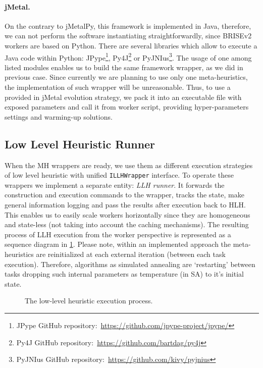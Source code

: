 \paragraph{jMetal.} On the contrary to jMetalPy, this framework is implemented in Java, therefore, we can not perform the software instantiating straightforwardly, since BRISEv2 workers are based on Python. There are several libraries which allow to execute a Java code within Python: JPype\footnote{JPype GitHub repository:~\url{https://github.com/jpype-project/jpype/}}, Py4J\footnote{Py4J GitHub repository:~\url{https://github.com/bartdag/py4j}} or PyJNIus\footnote{PyJNIus GitHub repository:~\url{https://github.com/kivy/pyjnius}}. The usage of one among listed modules enables us to build the same framework wrapper, as we did in previous case. Since currently we are planning to use only one meta-heuristics, the implementation of such wrapper will be unreasonable. Thus, to use a provided in jMetal evolution strategy, we pack it into an executable file with exposed parameters and call it from worker script, providing hyper-parameters settings and warming-up solutions.

\subsection{Low Level Heuristic Runner}
When the MH wrappers are ready, we use them as different execution strategies of low level heuristic with unified \texttt{ILLHWrapper} interface. To operate these wrappers we implement a separate entity: \emph{LLH runner}. It forwards the construction and execution commands to the wrapper, tracks the state, make general information logging and pass the results after execution back to HLH. This enables us to easily scale workers horizontally since they are homogeneous and state-less (not taking into account the caching mechanisms). The resulting process of LLH execution from the worker perspective is represented as a sequence diagram in \cref{impl:pict:llh sequence diagram}. Please note, within an implemented approach the meta-heuristics are reinitialized at each external iteration (between each task execution). Therefore, algorithms as simulated annealing are `restarting' between tasks dropping such internal parameters as temperature (in SA) to it's initial state.

\begin{figure}
	\centering
	
	\caption{The low-level heuristic execution process.}
	\label{impl:pict:llh sequence diagram}
\end{figure}

